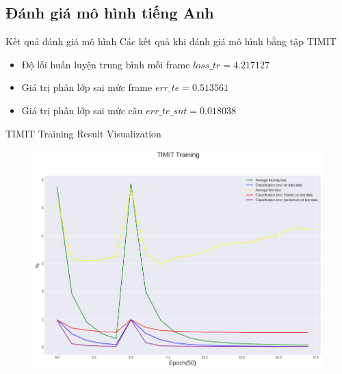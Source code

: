 \documentclass[notheorems, aspectratio=54]{beamer}
\begin{document}
\subsection{Đánh giá mô hình \textbf{tiếng Anh}}
\begin{frame}{Kết quả đánh giá mô hình}
	Các kết quả khi đánh giá mô hình bằng tập TIMIT
	\begin{itemize}
		\item Độ lỗi huấn luyện trung bình mỗi frame $loss\_tr=4.217127$
		\item Giá trị phân lớp sai mức frame $err\_te=0.513561$
		\item Giá trị phân lớp sai mức câu $err\_te\_snt =0.018038$
	\end{itemize}
\end{frame}
\begin{frame}{TIMIT Training Result Visualization}
	\begin{figure}[H]
		\includegraphics[width=0.8\linewidth]{result/sincnet_timit_plot.png}
		\label{fig:writing-thesis}
	\end{figure}
\end{frame}
\end{document}
